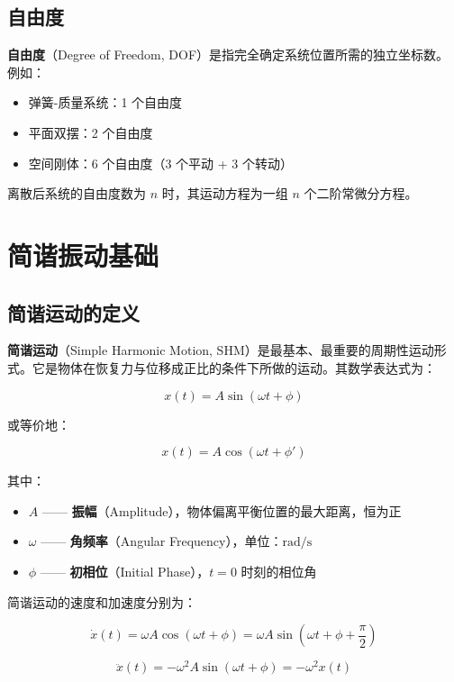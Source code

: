 \subsection{自由度}

\textbf{自由度}（Degree of Freedom, DOF）是指完全确定系统位置所需的独立坐标数。例如：
\begin{itemize}
    \item 弹簧-质量系统：1 个自由度
    \item 平面双摆：2 个自由度
    \item 空间刚体：6 个自由度（3 个平动 + 3 个转动）
\end{itemize}

离散后系统的自由度数为 $n$ 时，其运动方程为一组 $n$ 个二阶常微分方程。

\section{简谐振动基础}

\subsection{简谐运动的定义}

\textbf{简谐运动}（Simple Harmonic Motion, SHM）是最基本、最重要的周期性运动形式。它是物体在恢复力与位移成正比的条件下所做的运动。其数学表达式为：
\begin{myformula}
    \[
    x(t) = A\sin(\omega t + \phi)
    \]
\end{myformula}
或等价地：
\begin{myformula}
    \[
    x(t) = A\cos(\omega t + \phi')
    \]
\end{myformula}

其中：
\begin{itemize}
    \item $A$ —— \textbf{振幅}（Amplitude），物体偏离平衡位置的最大距离，恒为正
    \item $\omega$ —— \textbf{角频率}（Angular Frequency），单位：$\text{rad/s}$
    \item $\phi$ —— \textbf{初相位}（Initial Phase），$t=0$ 时刻的相位角
\end{itemize}

简谐运动的速度和加速度分别为：
\begin{myformula}
    \[
    \dot{x}(t) = \omega A\cos(\omega t + \phi) = \omega A\sin(\omega t + \phi + \frac{\pi}{2})
    \]
\end{myformula}
\begin{myformula}
    \[
    \ddot{x}(t) = -\omega^2 A\sin(\omega t + \phi) = -\omega^2 x(t)
    \]
\end{myformula}

